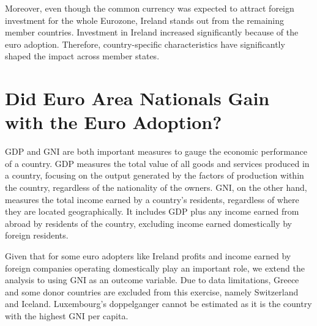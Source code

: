 \documentclass[12pt]{article}
\newcommand{\annote}[1]{\parbox{\textwidth}{\renewcommand{\baselinestretch}{1.0}\vspace{12pt} \small Notes: #1}}
\begin{document}
Moreover, even though the common currency was expected to attract foreign investment for the whole Eurozone, Ireland stands out from the remaining member countries. Investment in Ireland increased significantly because of the euro adoption. Therefore, country-specific characteristics have significantly shaped the impact across member states.



\section{Did Euro Area Nationals Gain with the Euro Adoption? \label{S_GNI}}

GDP and GNI are both important measures to gauge the economic performance of a country. GDP measures the total value of all goods and services produced in a country, focusing on the output generated by the factors of production within the country, regardless of the nationality of the owners. GNI, on the other hand, measures the total income earned by a country's residents, regardless of where they are located geographically. It includes GDP plus any income earned from abroad by residents of the country, excluding income earned domestically by foreign residents. 

Given that for some euro adopters like Ireland profits and income earned by foreign companies operating domestically play an important role, we extend the analysis to using GNI as an outcome variable. Due to data limitations, Greece and some donor countries are excluded from this exercise, namely Switzerland and Iceland. Luxembourg's doppelganger cannot be estimated as it is the country with the highest GNI per capita. 
\end{document}
